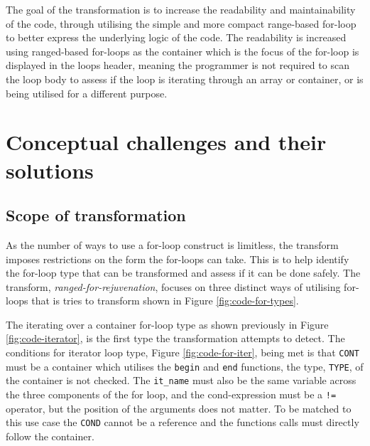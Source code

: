 \documentclass[bsc,frontabs,singlespacing,twoside,parskip,deptreport]{infthesis}
\begin{document}
The goal of the transformation is to increase the readability and maintainability of the code, through utilising the simple and more compact range-based for-loop to better express the underlying logic of the code. The readability is increased using ranged-based for-loops as the container which is the focus of the for-loop is displayed in the loops header, meaning the programmer is not required to scan the loop body to assess if the loop is iterating through an array or container, or is being utilised for a different purpose.



\section{Conceptual challenges and their solutions}\label{sec:for-concept}

\subsection{Scope of transformation}\label{sec:forLoop-scope-trans}

As the number of ways to use a for-loop construct is limitless, the transform imposes restrictions on the form the for-loops can take. This is to help identify the for-loop type that can be transformed and assess if it can be done safely. The transform, \textit{ranged-for-rejuvenation}, focuses on three distinct ways of utilising for-loops that is tries to transform shown in Figure \ref{fig:code-for-types}. 

The iterating over a container for-loop type as shown previously in Figure \ref{fig:code-iterator}, is the first type the transformation attempts to detect.
The conditions for iterator loop type, Figure \ref{fig:code-for-iter}, being met is that \texttt{CONT} must be a container which utilises the \texttt{begin} and \texttt{end} functions, the type, \texttt{TYPE}, of the container is not checked. The \texttt{it\_name} must also be the same variable across the three components of the for loop, and the cond-expression must be a \texttt{!=} operator, but the position of the arguments does not matter. To be matched to this use case the \texttt{COND} cannot be a reference and the functions calls must directly follow the container. 
\end{document}

